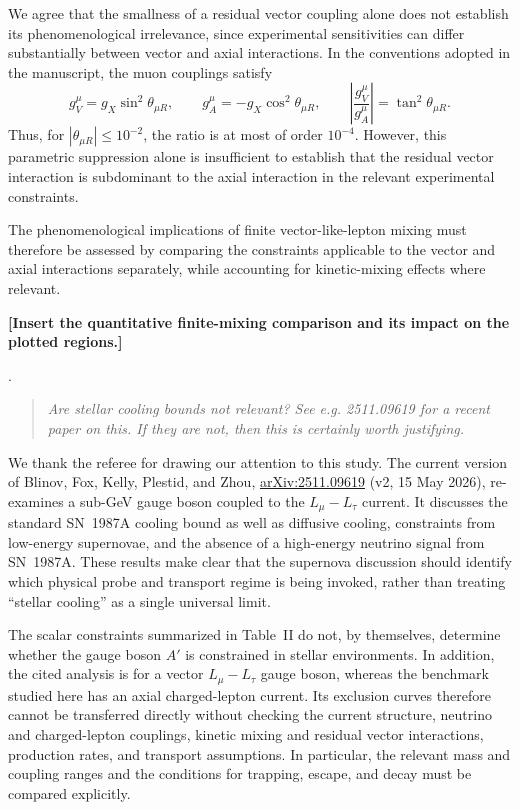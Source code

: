 \documentclass[12pt,a4paper]{article}
\begin{document}

We agree that the smallness of a residual vector coupling alone does not establish its phenomenological irrelevance, since experimental sensitivities can differ substantially between vector and axial interactions. In the conventions adopted in the manuscript, the muon couplings satisfy
\[
g_V^\mu=g_X\sin^2\theta_{\mu R},\qquad
g_A^\mu=-g_X\cos^2\theta_{\mu R},
\qquad
\left|\frac{g_V^\mu}{g_A^\mu}\right|
=\tan^2\theta_{\mu R}.
\]
Thus, for \(|\theta_{\mu R}|\leq10^{-2}\), the ratio is at most of order \(10^{-4}\). However, this parametric suppression alone is insufficient to establish that the residual vector interaction is subdominant to the axial interaction in the relevant experimental constraints.

The phenomenological implications of finite vector-like-lepton mixing must therefore be assessed by comparing the constraints applicable to the vector and axial interactions separately, while accounting for kinetic-mixing effects where relevant.

\textbf{[Insert the quantitative finite-mixing comparison and its impact on the plotted regions.]}

\medskip
{}.
\begin{quote}\itshape
Are stellar cooling bounds not relevant? See e.g. 2511.09619 for a recent paper on this. If they are not, then this is certainly worth justifying.
\end{quote}

We thank the referee for drawing our attention to this study. The current version of Blinov, Fox, Kelly, Plestid, and Zhou, \href{https://arxiv.org/abs/2511.09619}{arXiv:2511.09619} (v2, 15 May 2026), re-examines a sub-GeV gauge boson coupled to the \(L_\mu-L_\tau\) current. It discusses the standard SN~1987A cooling bound as well as diffusive cooling, constraints from low-energy supernovae, and the absence of a high-energy neutrino signal from SN~1987A. These results make clear that the supernova discussion should identify which physical probe and transport regime is being invoked, rather than treating “stellar cooling” as a single universal limit.

The scalar constraints summarized in Table~II do not, by themselves, determine whether the gauge boson \(A'\) is constrained in stellar environments. In addition, the cited analysis is for a vector \(L_\mu-L_\tau\) gauge boson, whereas the benchmark studied here has an axial charged-lepton current. Its exclusion curves therefore cannot be transferred directly without checking the current structure, neutrino and charged-lepton couplings, kinetic mixing and residual vector interactions, production rates, and transport assumptions. In particular, the relevant mass and coupling ranges and the conditions for trapping, escape, and decay must be compared explicitly.
\end{document}
